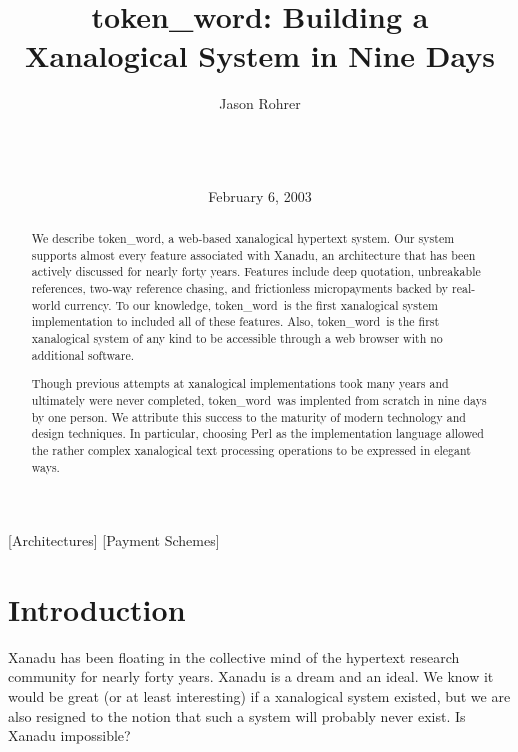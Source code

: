 \documentclass{acm_proc_article-sp}
\newcommand{\tw}{token\_word}
\begin{document}
\title{\tw:  Building a Xanalogical System in Nine Days}


\author{
\alignauthor Jason Rohrer\\
    \\
    \\
    \\
}

\date{February 6, 2003}


\maketitle

\begin{abstract}
We describe \tw, a web-based xanalogical hypertext system.  Our system supports almost every feature associated with Xanadu, an architecture that has been actively discussed for nearly forty years.
Features include deep quotation, unbreakable references, two-way reference chasing, and frictionless micropayments backed by real-world currency.
To our knowledge, \tw \ is the first xanalogical system implementation to included all of these features.  Also, \tw \ is the first xanalogical system of any kind to be accessible through a web browser with no additional software.

Though previous attempts at xanalogical implementations took many years and ultimately were never completed, \tw \ was implented from scratch in nine days by one person.  
We attribute this success to the maturity of modern technology and design techniques.  
In particular, choosing Perl as the implementation language allowed the rather complex xanalogical text processing operations to be expressed in elegant ways.

\end{abstract}

[Architectures]
[Payment Schemes]




\section{Introduction}
Xanadu has been floating in the collective mind of the hypertext research community for nearly forty years.
Xanadu is a dream and an ideal.  
We know it would be great (or at least interesting) if a xanalogical system existed, but we are also resigned to the notion that such a system will probably never exist.
Is Xanadu impossible?
\end{document}
